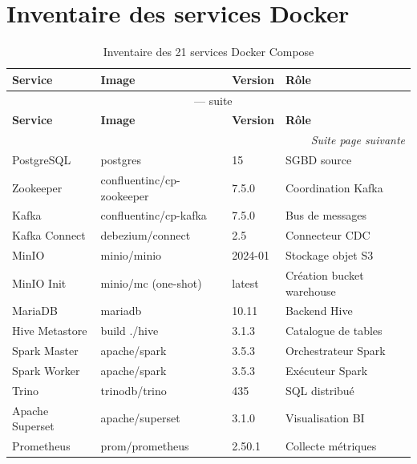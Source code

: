 \documentclass[12pt,a4paper]{report}
\begin{document}
\section{Inventaire des services Docker}

\begin{longtable}{llll}
\caption{Inventaire des 21 services Docker Compose}
\label{tab:services}\\
\toprule
\textbf{Service} & \textbf{Image} & \textbf{Version} & \textbf{Rôle} \\
\midrule
\endfirsthead
\multicolumn{4}{c}{\tablename\ \thetable{} --- suite}\\
\toprule
\textbf{Service} & \textbf{Image} & \textbf{Version} & \textbf{Rôle} \\
\midrule
\endhead
\midrule
\multicolumn{4}{r}{\itshape Suite page suivante}\\
\endfoot
\bottomrule
\endlastfoot
PostgreSQL      & postgres                                & 15       & SGBD source            \\
Zookeeper       & confluentinc/cp-zookeeper               & 7.5.0    & Coordination Kafka     \\
Kafka           & confluentinc/cp-kafka                   & 7.5.0    & Bus de messages        \\
Kafka Connect   & debezium/connect                        & 2.5      & Connecteur CDC         \\
MinIO           & minio/minio                             & 2024-01  & Stockage objet S3      \\
MinIO Init      & minio/mc (one-shot)                     & latest   & Création bucket warehouse \\
MariaDB         & mariadb                                 & 10.11    & Backend Hive           \\
Hive Metastore  & build ./hive                            & 3.1.3    & Catalogue de tables    \\
Spark Master    & apache/spark                            & 3.5.3    & Orchestrateur Spark    \\
Spark Worker    & apache/spark                            & 3.5.3    & Exécuteur Spark        \\
Trino           & trinodb/trino                           & 435      & SQL distribué          \\
Apache Superset & apache/superset                         & 3.1.0    & Visualisation BI       \\
Prometheus      & prom/prometheus                         & 2.50.1   & Collecte métriques     \\

\end{longtable}
\end{document}
